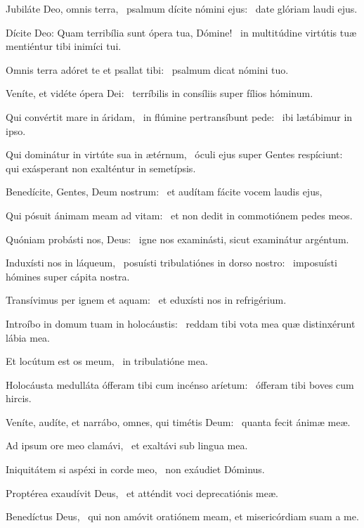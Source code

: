 \item Jubiláte Deo, omnis terra,~\pscross{} psalmum dícite nómini ejus:~\psstar{} date glóriam laudi ejus.

\item Dícite Deo: Quam terribília sunt ópera tua, Dómine!~\psstar{} in multitúdine virtútis tuæ mentiéntur tibi inimíci tui.

\item Omnis terra adóret te et psallat tibi:~\psstar{} psalmum dicat nómini tuo.

\item Veníte, et vidéte ópera Dei:~\psstar{} terríbilis in consíliis super fílios hóminum.

\item Qui convértit mare in áridam,~\pscross{} in flúmine pertransíbunt pede:~\psstar{} ibi lætábimur in ipso.

\item Qui dominátur in virtúte sua in ætérnum,~\pscross{} óculi ejus super Gentes respíciunt:~\psstar{} qui exásperant non exalténtur in semetípsis.

\item Benedícite, Gentes, Deum nostrum:~\psstar{} et audítam fácite vocem laudis ejus,

\item Qui pósuit ánimam meam ad vitam:~\psstar{} et non dedit in commotiónem pedes meos.

\item Quóniam probásti nos, Deus:~\psstar{} igne nos examinásti, sicut examinátur argéntum.

\item Induxísti nos in láqueum,~\pscross{} posuísti tribulatiónes in dorso nostro:~\psstar{} imposuísti hómines super cápita nostra.

\item Transívimus per ignem et aquam:~\psstar{} et eduxísti nos in refrigérium.

\item Introíbo in domum tuam in holocáustis:~\psstar{} reddam tibi vota mea quæ distinxérunt lábia mea.

\item Et locútum est os meum,~\psstar{} in tribulatióne mea.

\item Holocáusta medulláta ófferam tibi cum incénso aríetum:~\psstar{} ófferam tibi boves cum hircis.

\item Veníte, audíte, et narrábo, omnes, qui timétis Deum:~\psstar{} quanta fecit ánimæ meæ.

\item Ad ipsum ore meo clamávi,~\psstar{} et exaltávi sub lingua mea.

\item Iniquitátem si aspéxi in corde meo,~\psstar{} non exáudiet Dóminus.

\item Proptérea exaudívit Deus,~\psstar{} et atténdit voci deprecatiónis meæ.

\item Benedíctus Deus,~\psstar{} qui non amóvit oratiónem meam, et misericórdiam suam a me.


